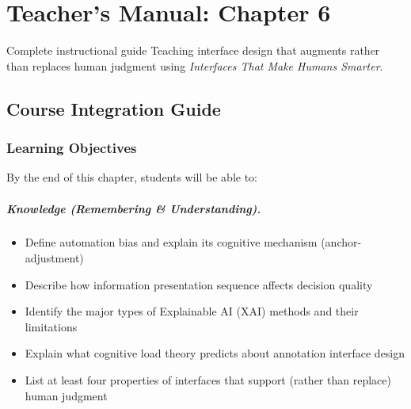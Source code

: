
\chapter{Teacher's Manual: Chapter 6}
\label{ch:teacher-ch06}

\begin{chapterquote}{Complete instructional guide}
Teaching interface design that augments rather than replaces human judgment using \emph{Interfaces That Make Humans Smarter}.
\end{chapterquote}

\section{Course Integration Guide}

\subsection{Learning Objectives}

By the end of this chapter, students will be able to:

\paragraph{Knowledge (Remembering \& Understanding).}
\begin{itemize}
    \item Define automation bias and explain its cognitive mechanism (anchor-adjustment)
    \item Describe how information presentation sequence affects decision quality
    \item Identify the major types of Explainable AI (XAI) methods and their limitations
    \item Explain what cognitive load theory predicts about annotation interface design
    \item List at least four properties of interfaces that support (rather than replace) human judgment
\end{itemize}

